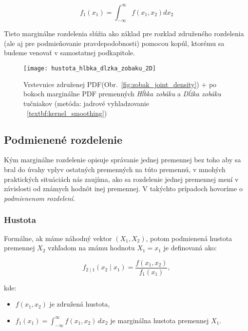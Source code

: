 \begin{equation} f_1(x_1) = \int_{-\infty}^{\infty} f(x_1, x_2)  dx_2 \end{equation}

Tieto marginálne rozdelenia slúžia ako základ pre rozklad združeného rozdelenia (ale aj pre podmieňovanie pravdepodobnosti) pomocou kopúl, ktorému sa budeme venovať v samostatnej podkapitole.

\begin{figure}[H]
    \centering
    \texttt{[image: hustota\_hlbka\_dlzka\_zobaku\_2D]}
    \caption{Vrstevnice združenej PDF(Obr.~\ref{fig:zobak_joint_density}) + po bokoch marginálne PDF premenných \textit{Hĺbka zobáku} a \textit{Dĺžka zobáku} tučniakov (metóda: jadrové vyhladzovanie ~\ref{textbf:kernel_smoothing})}
    \label{fig:zobak_marg_density}
\end{figure}

\subsection{Podmienené rozdelenie}\label{subsec:conditional_distribution}

Kým marginálne rozdelenie opisuje správanie jednej premennej bez toho aby sa bral do úvahy vplyv ostatných premenných na túto premennú, v mnohých praktických situáciách nás zaujíma, ako sa rozdelenie jednej premennej mení v závislosti od známych hodnôt inej premennej. V takýchto prípadoch hovoríme o \textit{podmienenom rozdelení}.

\subsubsection{Hustota}\label{subsubsec:conditional_density}

Formálne, ak máme náhodný vektor $(X_1, X_2)$, potom podmienená hustota premennej $X_2$ vzhľadom na známu hodnotu $X_1 = x_1$ je definovaná ako:

\begin{equation}
f_{2 \mid 1}(x_2 \mid x_1) = \frac{f(x_1, x_2)}{f_1(x_1)},
\end{equation}

kde:
\begin{itemize}
  \item $f(x_1, x_2)$ je združená hustota,
  \item $f_1(x_1) = \int_{-\infty}^{\infty} f(x_1, x_2) \, dx_2$ je marginálna hustota premennej $X_1$.
\end{itemize}

